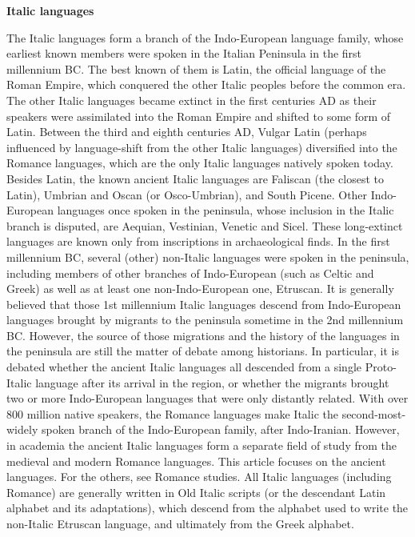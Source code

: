 \documentclass[11pt]{scrartcl} %
\begin{document}
\noindent \textbf{Italic languages} \par

The Italic languages form a branch of the Indo-European language family, whose earliest known members were spoken in the Italian Peninsula in the first millennium BC. The best known of them is Latin, the official language of the Roman Empire, which conquered the other Italic peoples before the common era. The other Italic languages became extinct in the first centuries AD as their speakers were assimilated into the Roman Empire and shifted to some form of Latin. Between the third and eighth centuries AD, Vulgar Latin (perhaps influenced by language-shift from the other Italic languages) diversified into the Romance languages, which are the only Italic languages natively spoken today. Besides Latin, the known ancient Italic languages are Faliscan (the closest to Latin), Umbrian and Oscan (or Osco-Umbrian), and South Picene. Other Indo-European languages once spoken in the peninsula, whose inclusion in the Italic branch is disputed, are Aequian, Vestinian, Venetic and Sicel. These long-extinct languages are known only from inscriptions in archaeological finds. In the first millennium BC, several (other) non-Italic languages were spoken in the peninsula, including members of other branches of Indo-European (such as Celtic and Greek) as well as at least one non-Indo-European one, Etruscan. It is generally believed that those 1st millennium Italic languages descend from Indo-European languages brought by migrants to the peninsula sometime in the 2nd millennium BC. However, the source of those migrations and the history of the languages in the peninsula are still the matter of debate among historians. In particular, it is debated whether the ancient Italic languages all descended from a single Proto-Italic language after its arrival in the region, or whether the migrants brought two or more Indo-European languages that were only distantly related. With over 800 million native speakers, the Romance languages make Italic the second-most-widely spoken branch of the Indo-European family, after Indo-Iranian. However, in academia the ancient Italic languages form a separate field of study from the medieval and modern Romance languages. This article focuses on the ancient languages. For the others, see Romance studies. All Italic languages (including Romance) are generally written in Old Italic scripts (or the descendant Latin alphabet and its adaptations), which descend from the alphabet used to write the non-Italic Etruscan language, and ultimately from the Greek alphabet. \par
\end{document}
